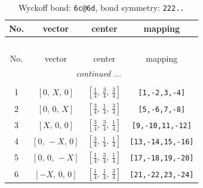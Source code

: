 \documentclass[fleqn,8pt]{jsarticle}
\begin{document}
\begin{longtable}{cccc}
\caption{Wyckoff bond: {\tt 6c@6d}, bond symmetry: {\tt 222..}}
 \\
 \hline \hline
No. & vector & center & mapping \\ \hline \endfirsthead

\multicolumn{3}{l}{\tablename\ \thetable{}} \\
 \hline \hline
No. & vector & center & mapping \\ \hline \endhead

 \hline \hline
\multicolumn{3}{r}{\footnotesize\it continued ...} \\ \endfoot

 \hline \hline
\multicolumn{3}{r}{} \\ \endlastfoot

1 & $\left[ 0,\, X,\, 0 \right]$ & $\left[ \frac{1}{4},\, \frac{3}{4},\, \frac{3}{4} \right]$ & {\tt [1,-2,3,-4]} \\ \hline
2 & $\left[ 0,\, 0,\, X \right]$ & $\left[ \frac{3}{4},\, \frac{1}{4},\, \frac{3}{4} \right]$ & {\tt [5,-6,7,-8]} \\ \hline
3 & $\left[ X,\, 0,\, 0 \right]$ & $\left[ \frac{3}{4},\, \frac{3}{4},\, \frac{1}{4} \right]$ & {\tt [9,-10,11,-12]} \\ \hline
4 & $\left[ 0,\, - X,\, 0 \right]$ & $\left[ \frac{3}{4},\, \frac{1}{4},\, \frac{1}{4} \right]$ & {\tt [13,-14,15,-16]} \\ \hline
5 & $\left[ 0,\, 0,\, - X \right]$ & $\left[ \frac{1}{4},\, \frac{3}{4},\, \frac{1}{4} \right]$ & {\tt [17,-18,19,-20]} \\ \hline
6 & $\left[ - X,\, 0,\, 0 \right]$ & $\left[ \frac{1}{4},\, \frac{1}{4},\, \frac{3}{4} \right]$ & {\tt [21,-22,23,-24]} \\
\end{longtable}
\renewcommand{\arraystretch}{1.2}
\end{document}
